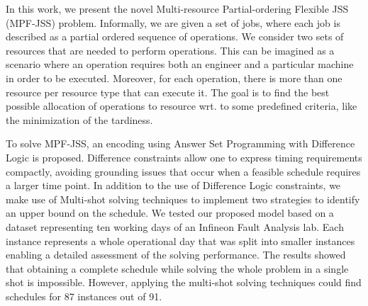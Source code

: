 \documentclass[submission,copyright,creativecommons]{eptcs}
\begin{document}
In this work, we present the novel Multi-resource Partial-ordering Flexible JSS (MPF-JSS) problem. Informally, we are given a set of jobs, where each job is described as a partial ordered sequence of operations. We consider two sets of resources that are needed to perform operations. This can be imagined as a scenario where an operation requires both an engineer and a particular machine in order to be executed. Moreover, for each operation, there is more than one resource per resource type that can execute it. The goal is to find the best possible allocation of operations to resource wrt. to some predefined criteria, like the minimization of the tardiness. 

To solve MPF-JSS, an encoding using Answer Set Programming with Difference Logic \cite{gebser2016theory} is proposed. Difference constraints allow one to express timing requirements compactly, avoiding grounding issues that occur when a feasible schedule requires a larger time point. In addition to the use of Difference Logic constraints, we make use of Multi-shot solving \cite{gebser2019multi} techniques to implement two strategies to identify an upper bound on the schedule.
We tested our proposed model based on a dataset representing ten working days of an Infineon Fault Analysis lab. Each instance represents a whole operational day that was split into smaller instances enabling a detailed assessment of the solving performance. The results showed that obtaining a complete schedule while solving the whole problem in a single shot is impossible. However, applying the multi-shot solving techniques could find schedules for 87 instances out of 91. 
\end{document}
